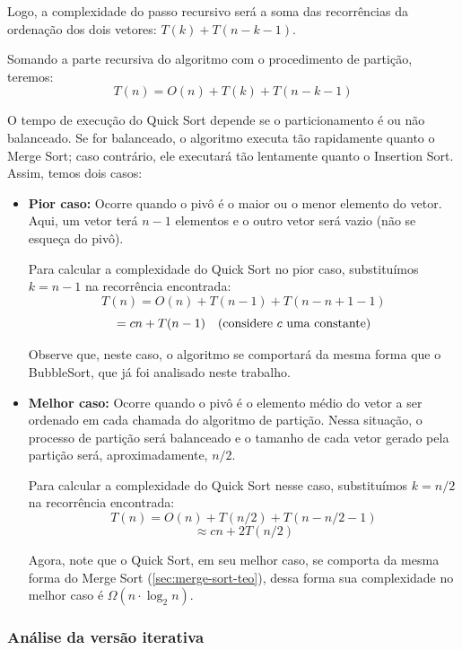 Logo, a complexidade do passo recursivo será a soma das recorrências da ordenação dos dois vetores: \( T(k) + T(n - k - 1) \).

Somando a parte recursiva do algoritmo com o procedimento de partição, teremos:
\[
	T(n) = O(n) + T(k) + T(n - k - 1)
\]

O tempo de execução do Quick Sort depende se o particionamento é ou não balanceado. Se for balanceado, o algoritmo executa tão rapidamente quanto o Merge Sort; caso contrário, ele executará tão lentamente quanto o Insertion Sort. Assim, temos dois casos:

\begin{itemize}
	\item \textbf{Pior caso:} Ocorre quando o pivô é o maior ou o menor elemento do vetor. Aqui, um vetor terá \( n-1 \) elementos e o outro vetor será vazio (não se esqueça do pivô).

	      Para calcular a complexidade do Quick Sort no pior caso, substituímos \( k = n - 1 \) na recorrência encontrada:
	      \[
		      T(n) = O(n) + T(n-1) + T(n - n + 1 - 1)
	      \]
	      \[
		      = cn + T(n-1) \quad \text{(considere \( c \) uma constante)}
	      \]

	      Observe que, neste caso, o algoritmo se comportará da mesma forma que o BubbleSort, que já foi analisado neste trabalho.

	\item \textbf{Melhor caso:} Ocorre quando o pivô é o elemento médio do vetor a ser ordenado em cada chamada do algoritmo de partição. Nessa situação, o processo de partição será balanceado e o tamanho de cada vetor gerado pela partição será, aproximadamente, \( n/2 \).

	      Para calcular a complexidade do Quick Sort nesse caso, substituímos \( k = n/2 \) na recorrência encontrada:
	      \[
		      T(n) = O(n) + T(n/2) + T(n - n/2 - 1)
	      \]
	      \[
		      \approx cn + 2T(n/2)
	      \]

	      Agora, note que o Quick Sort, em seu melhor caso, se comporta da mesma forma do Merge Sort (\ref{sec:merge-sort-teo}), dessa forma sua complexidade no melhor caso é $\Omega(n \cdot \log_2 n)$.

\end{itemize}

\subsubsection{Análise da versão iterativa}

